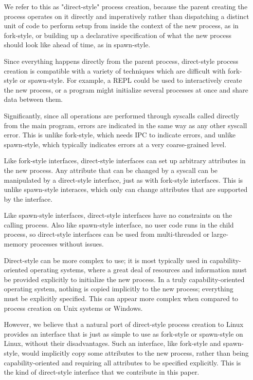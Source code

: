 \documentclass[sigplan]{acmart}
\begin{document}
We refer to this as "direct-style" process creation,
because the parent creating the process operates on it directly and imperatively
rather than dispatching a distinct unit of code to perform setup from inside the context of the new process,
as in fork-style,
or building up a declarative specification of what the new process should look like ahead of time,
as in spawn-style.

Since everything happens directly from the parent process,
direct-style process creation is compatible with a variety of techniques
which are difficult with fork-style or spawn-style.
For example, a REPL could be used to interactively create the new process,
or a program might initialize several processes at once and share data between them.

Significantly,
since all operations are performed through syscalls called directly from the main program,
errors are indicated in the same way as any other syscall error.
This is unlike fork-style, which needs IPC to indicate errors,
and unlike spawn-style, which typically indicates errors at a very coarse-grained level.

Like fork-style interfaces,
direct-style interfaces can set up arbitrary attributes in the new process.
Any attribute that can be changed by a syscall
can be manipulated by a direct-style interface,
just as with fork-style interfaces.
This is unlike spawn-style interaces,
which only can change attributes that are supported by the interface.

Like spawn-style interfaces,
direct-style interfaces have no constraints on the calling process.
Also like spawn-style interface,
no user code runs in the child process, so
direct-style interfaces can be used from multi-threaded or large-memory processes without issues.

Direct-style can be more complex to use;
it is most typically used in capability-oriented operating systems,
where a great deal of resources and information must be provided explicitly to initialize the new process.
In a truly capability-oriented operating system,
nothing is copied implicitly to the new process;
everything must be explicitly specified.
This can appear more complex
when compared to process creation on Unix systems or Windows.

However, we believe that a natural port of direct-style process creation to Linux
provides an interface that is just as simple to use as fork-style or spawn-style on Linux,
without their disadvantages.
Such an interface, like fork-style and spawn-style,
would implicitly copy some attributes to the new process,
rather than being capability-oriented and requiring all attributes to be specified explicitly.
This is the kind of direct-style interface that we contribute in this paper.
\end{document}
